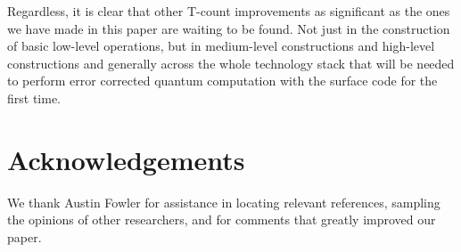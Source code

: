 \documentclass[twocolumn]{revtex4-1}
\begin{document}
Regardless, it is clear that other T-count improvements as significant as the ones we have made in this paper are waiting to be found.
Not just in the construction of basic low-level operations, but in medium-level constructions and high-level constructions and generally across the whole technology stack that will be needed to perform error corrected quantum computation with the surface code for the first time.


\section{Acknowledgements}

We thank Austin Fowler for assistance in locating relevant references, sampling the opinions of other researchers, and for comments that greatly improved our paper.




\end{document}
